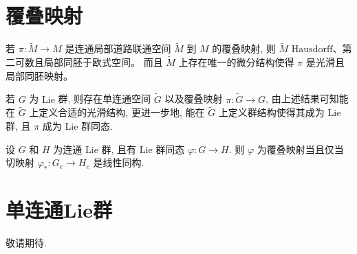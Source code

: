 \section{覆叠映射}

    若 $\pi:\tilde{M}\rightarrow M$ 是连通局部道路联通空间 $\tilde{M}$ 到 $M$ 的覆叠映射, 则 $\tilde{M}$ $\mathrm{Hausdorff}$、第二可数且局部同胚于欧式空间。
    而且 $\tilde{M}$ 上存在唯一的微分结构使得 $\pi$ 是光滑且局部同胚映射。

    若 $G$ 为 $\mathrm{Lie}$ 群, 则存在单连通空间 $\tilde{G}$ 以及覆叠映射 $\pi:\tilde{G}\rightarrow G$, 由上述结果可知能在 $\tilde{G}$ 上定义合适的光滑结构,
    更进一步地, 能在 $\tilde{G}$ 上定义群结构使得其成为 $\mathrm{Lie}$ 群, 且 $\pi$ 成为 $\mathrm{Lie}$ 群同态.

    \begin{proposition}[Lie群同态与覆叠映射]
        设 $G$ 和 $H$ 为连通 $\mathrm{Lie}$ 群, 且有 $\mathrm{Lie}$ 群同态 $\varphi:G\rightarrow H$.
        则 $\varphi$ 为覆叠映射当且仅当切映射 $\varphi_*:G_e\rightarrow H_e$ 是线性同构.
    \end{proposition}

\section{单连通Lie群}
    \begin{theorem}
        敬请期待.
    \end{theorem}
